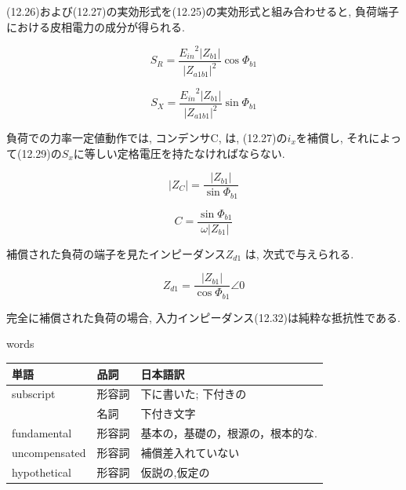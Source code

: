 \documentclass[fleqn,11pt,a4paper,dvipdfmx]{jsarticle}
\numberwithin{equation}{section}
\begin{document}
(12.26)および(12.27)の実効形式を(12.25)の実効形式と組み合わせると, 負荷端子における皮相電力の成分が得られる. 

\begin{equation}
  S_R = \frac{{E_{in}}^2 \left|Z_{b1}\right|}{{\left|Z_{a1b1}\right|}^2}\cos\Phi_{b1}
\end{equation}

\begin{equation}
  S_X = \frac{{E_{in}}^2 \left|Z_{b1}\right|}{{\left|Z_{a1b1}\right|}^2}\sin\Phi_{b1}
\end{equation}

負荷での力率一定値動作では, コンデンサC, 
は, (12.27)の$i_x$を補償し, それによって(12.29)の$S_x$に等しい定格電圧を持たなければならない. 

\begin{equation}
  \left|Z_C\right| = \frac{\left|Z_{b1}\right|}{\sin \Phi_{b1}}
\end{equation}

\begin{equation}
  C = \frac{\sin \Phi_{b1}}{\omega \left|Z_{b1}\right|}
\end{equation}

補償された負荷の端子を見たインピーダンス$Z_{d1}$ は, 次式で与えられる. 

\begin{equation}
  Z_{d1} = \frac{\left|Z_{b1}\right|}{\cos \Phi_{b1}} \angle 0
\end{equation}

完全に補償された負荷の場合, 入力インピーダンス(12.32)は純粋な抵抗性である. 


\newpage
words
  \begin{table}[h]
    \begin{tabular}{lll}
    単語            & 品詞    & 日本語訳                 \\ \hline
    subscript     & 形容詞   & 下に書いた; 下付きの              \\ 
                  & 名詞    & 下付き文字                     \\ \hline
    fundamental    & 形容詞   & 基本の，基礎の，根源の，根本的な. \\ \hline
    uncompensated  & 形容詞   & 補償差入れていない  \\ \hline
    hypothetical    & 形容詞  & 仮説の,仮定の   \\ \hline


    \end{tabular}
    \end{table}
\end{document}
